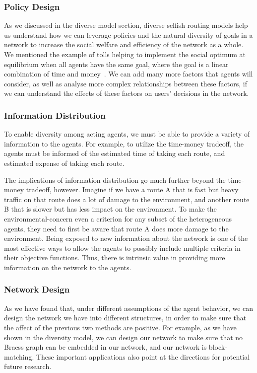 \subsubsection{Policy Design}
As we discussed in the diverse model section, diverse selfish routing models help us understand how we can leverage policies and the natural diversity of goals in a network to increase the social welfare and efficiency of the network as a whole. 
We mentioned the example of tolls helping to implement the social optimum at equilibrium when all agents have the same goal, where the goal is a linear combination of time and money~\cite{beckmann1956studies}. We can add many more factors that agents will consider, as well as analyse more complex relationships between these factors, if we can understand the effects of these factors on users' decisions in the network.

\subsubsection{Information Distribution}
To enable diversity among acting agents, we must be able to provide a variety of information to the agents. For example, to utilize the time-money tradeoff, the agents must be informed of the estimated time of taking each route, and estimated expense of taking each route. 

The implications of information distribution go much further beyond the time-money tradeoff, however. Imagine if we have a route A that is fast but heavy traffic on that route does a lot of damage to the environment, and another route B that is slower but has less impact on the environment. To make the environmental-concern even a criterion for any subset of the heterogeneous agents, they need to first be aware that route A does more damage to the environment. Being exposed to new information about the network is one of the most effective ways to allow the agents to possibly include multiple criteria in their objective functions. Thus, there is intrinsic value in providing more information on the network to the agents.

\subsubsection{Network Design}

As we have found that, under different assumptions of the agent behavior, we can design the network we have into different structures, in order to make sure that the affect of the previous two methods are positive. For example, as we have shown in the diversity model, we can design our network to make sure that no Braess graph can be embedded in our network, and our network is block-matching.
These important applications also point at the directions for potential future research. 

